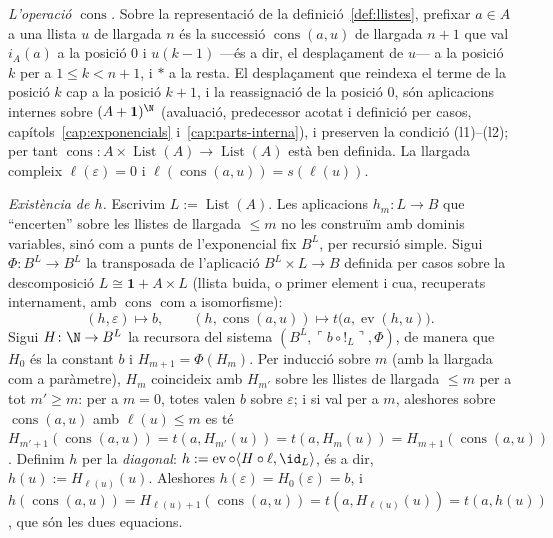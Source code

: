 \begin{prova}
\emph{L'operació \(\operatorname{cons}\).} Sobre la representació de la
definició~\ref{def:llistes}, prefixar \(a\in A\) a una llista \(u\) de
llargada \(n\) és la successió \(\operatorname{cons}(a,u)\) de llargada
\(n+1\) que val \(i_A(a)\) a la posició \(0\) i \(u(k-1)\) ---és a dir, el
desplaçament de \(u\)--- a la posició \(k\) per a \(1\le k<n+1\), i \(\ast\)
a la resta. El desplaçament que reindexa el terme de la posició \(k\) cap a
la posició \(k+1\), i la reassignació de la posició \(0\), són aplicacions
internes sobre
\((A+\mathbf1)^{\N}\) (avaluació, predecessor acotat i definició per casos,
capítols~\ref{cap:exponencials} i~\ref{cap:parts-interna}), i preserven la
condició (l1)--(l2); per tant
\(\operatorname{cons}\colon A\times\operatorname{List}(A)\to
\operatorname{List}(A)\) està ben definida. La llargada compleix
\(\ell(\varepsilon)=0\) i \(\ell(\operatorname{cons}(a,u))=s(\ell(u))\).

\emph{Existència de \(h\).} Escrivim \(L:=\operatorname{List}(A)\). Les
aplicacions \(h_m\colon L\to B\) que \enquote{encerten} sobre les llistes
de llargada \(\le m\) no les construïm amb dominis variables, sinó com a
punts de l'exponencial fix \(B^{L}\), per recursió simple. Sigui
\(\Phi\colon B^{L}\to B^{L}\) la transposada de l'aplicació
\(B^{L}\times L\to B\) definida per casos sobre la descomposició
\(L\cong\mathbf1+A\times L\) (llista buida, o primer element i cua,
recuperats internament, amb \(\operatorname{cons}\) com a isomorfisme):
\[
(h,\varepsilon)\mapsto b,
\qquad
(h,\operatorname{cons}(a,u))\mapsto t\bigl(a,\operatorname{ev}(h,u)\bigr).
\]
Sigui \(H\colon\N\to B^{L}\) la recursora del sistema
\((B^{L},\ulcorner b\circ{!}_L\urcorner,\Phi)\), de manera que
\(H_{0}\) és la constant \(b\) i \(H_{m+1}=\Phi(H_m)\). Per inducció
sobre \(m\) (amb la llargada com a paràmetre), \(H_m\) coincideix amb
\(H_{m'}\) sobre les llistes de llargada \(\le m\) per a tot \(m'\ge m\):
per a \(m=0\), totes valen \(b\) sobre \(\varepsilon\); i si val per a
\(m\), aleshores sobre \(\operatorname{cons}(a,u)\) amb \(\ell(u)\le m\)
es té \(H_{m'+1}(\operatorname{cons}(a,u))=t(a,H_{m'}(u))=t(a,H_m(u))
=H_{m+1}(\operatorname{cons}(a,u))\). Definim \(h\) per la
\emph{diagonal}: \(h:=\operatorname{ev}\circ\langle H\circ\ell,\id_L\rangle\),
és a dir, \(h(u):=H_{\ell(u)}(u)\). Aleshores \(h(\varepsilon)=H_0(\varepsilon)=b\),
i \(h(\operatorname{cons}(a,u))=H_{\ell(u)+1}(\operatorname{cons}(a,u))
=t(a,H_{\ell(u)}(u))=t(a,h(u))\), que són les dues equacions.


\end{prova}
